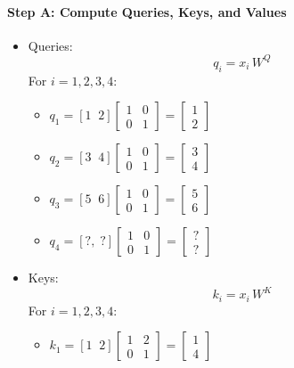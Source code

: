\paragraph{Step A: Compute Queries, Keys, and Values}

\begin{itemize}
	\item Queries:  
   \[
     q_i = x_i \, W^Q 
   \]
   For \(i=1,2,3,4\):
   \begin{itemize}
	   \item \(q_1 = [1\;\;2] \begin{bmatrix}1 & 0 \\ 0 & 1\end{bmatrix} = \begin{bmatrix}1 \\ 2\end{bmatrix}\)
	   \item \(q_2 = [3\;\;4] \begin{bmatrix}1 & 0 \\ 0 & 1\end{bmatrix} = \begin{bmatrix}3 \\ 4\end{bmatrix}\)
	   \item \(q_3 = [5\;\;6] \begin{bmatrix}1 & 0 \\ 0 & 1\end{bmatrix} = \begin{bmatrix}5 \\ 6\end{bmatrix}\)
	   \item \(q_4 = [?,\; ?] \begin{bmatrix}1 & 0 \\ 0 & 1\end{bmatrix} = \begin{bmatrix}? \\ ?\end{bmatrix}\)
   \end{itemize}
	\item Keys:
	   \[
		 k_i = x_i \, W^K
	   \]
	   For \(i=1,2,3,4\):
	   \begin{itemize}
		   \item \(k_1 = [1\;\;2] \begin{bmatrix}1 & 2 \\ 0 & 1\end{bmatrix}
			 = \begin{bmatrix}1 \\ 4\end{bmatrix}\)

\end{itemize}
\end{itemize}
